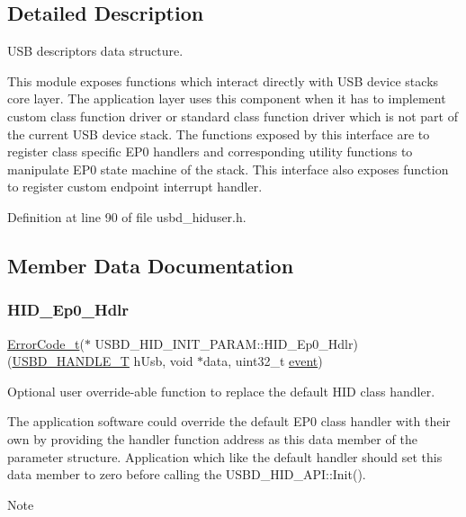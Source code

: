 \subsection{Detailed Description}
U\+SB descriptors data structure. 

This module exposes functions which interact directly with U\+SB device stack\textquotesingle{}s core layer. The application layer uses this component when it has to implement custom class function driver or standard class function driver which is not part of the current U\+SB device stack. The functions exposed by this interface are to register class specific E\+P0 handlers and corresponding utility functions to manipulate E\+P0 state machine of the stack. This interface also exposes function to register custom endpoint interrupt handler. 

Definition at line 90 of file usbd\+\_\+hiduser.\+h.



\subsection{Member Data Documentation}
\mbox{\label{struct_u_s_b_d___h_i_d___i_n_i_t___p_a_r_a_m_abb727433ef7a7de8566347963d5b8dc0}} 
\subsubsection{\texorpdfstring{H\+I\+D\+\_\+\+Ep0\+\_\+\+Hdlr}{HID\_Ep0\_Hdlr}}
{\footnotesize\ttfamily \hyperlink{error_8h_a905255056c349318139d94aa4523d516}{Error\+Code\+\_\+t}($\ast$ U\+S\+B\+D\+\_\+\+H\+I\+D\+\_\+\+I\+N\+I\+T\+\_\+\+P\+A\+R\+A\+M\+::\+H\+I\+D\+\_\+\+Ep0\+\_\+\+Hdlr) (\hyperlink{group___u_s_b_d___core_gafdbb2204d929cb9d75736bd2b42342ac}{U\+S\+B\+D\+\_\+\+H\+A\+N\+D\+L\+E\+\_\+T} h\+Usb, void $\ast$data, uint32\+\_\+t \hyperlink{structevent}{event})}

Optional user override-\/able function to replace the default H\+ID class handler.

The application software could override the default E\+P0 class handler with their own by providing the handler function address as this data member of the parameter structure. Application which like the default handler should set this data member to zero before calling the U\+S\+B\+D\+\_\+\+H\+I\+D\+\_\+\+A\+P\+I\+::\+Init(). ~\newline
\begin{DoxyNote}{Note}

\end{DoxyNote}

